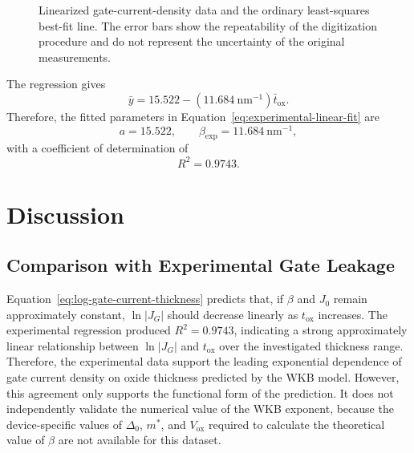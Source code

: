 \documentclass[12pt]{article}
\begin{document}
\begin{figure}[H]
\begin{singlespace}
        \caption{Linearized gate-current-density data and the ordinary least-squares best-fit line. The error bars show the repeatability of the digitization procedure and do not represent the uncertainty of the original measurements.}
        \label{fig:experimental-linear-fit}
    \end{singlespace}
\end{figure}

The regression gives
\begin{equation}
    \bar{y}
    =15.522-
    \left(11.684~\mathrm{nm^{-1}}\right)
    \bar{t}_{\mathrm{ox}}.
    \label{eq:experimental-fit-result}
\end{equation}
Therefore, the fitted parameters in Equation~\eqref{eq:experimental-linear-fit} are
\begin{equation}
    a=15.522,
    \qquad
    \beta_{\mathrm{exp}}=11.684~\mathrm{nm^{-1}},
\end{equation}
with a coefficient of determination of
\begin{equation}
    R^2=0.9743.
\end{equation}

\section{Discussion}

\subsection{Comparison with Experimental Gate Leakage}

Equation~\eqref{eq:log-gate-current-thickness} predicts that, if \(\beta\) and \(J_0\) remain approximately constant, \(\ln |J_G|\) should decrease linearly as \(t_{\mathrm{ox}}\) increases. The experimental regression produced \(R^2=0.9743\), indicating a strong approximately linear relationship between \(\ln |J_G|\) and \(t_{\mathrm{ox}}\) over the investigated thickness range. Therefore, the experimental data support the leading exponential dependence of gate current density on oxide thickness predicted by the WKB model. However, this agreement only supports the functional form of the prediction. It does not independently validate the numerical value of the WKB exponent, because the device-specific values of \(\Delta_0\), \(m^*\), and \(V_{\mathrm{ox}}\) required to calculate the theoretical value of \(\beta\) are not available for this dataset.
\end{document}
